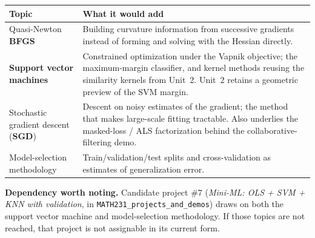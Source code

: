 \documentclass[11pt]{article}
\begin{document}
\begin{center}
\renewcommand{\arraystretch}{1.45}
\begin{tabular}{@{}p{4.4cm} p{9.6cm}@{}}
\toprule
\textbf{Topic} & \textbf{What it would add} \\
\midrule
Quasi-Newton \textbf{BFGS} &
  Building curvature information from successive gradients instead of forming
  and solving with the Hessian directly. \\
\textbf{Support vector machines} &
  Constrained optimization under the Vapnik objective; the maximum-margin
  classifier, and kernel methods reusing the similarity kernels from Unit~2.
  Unit~2 retains a geometric preview of the SVM margin. \\
Stochastic gradient descent (\textbf{SGD}) &
  Descent on noisy estimates of the gradient; the method that makes
  large-scale fitting tractable. Also underlies the masked-loss / ALS
  factorization behind the collaborative-filtering demo. \\
Model-selection methodology &
  Train/validation/test splits and cross-validation as estimates of
  generalization error. \\
\bottomrule
\end{tabular}
\end{center}

\bigskip
\noindent\textbf{Dependency worth noting.} Candidate project \#7
(\emph{Mini-ML: OLS + SVM + KNN with validation}, in
\texttt{MATH231\_projects\_and\_demos}) draws on both the support vector machine
and model-selection methodology. If those topics are not reached, that project
is not assignable in its current form.
\end{document}
